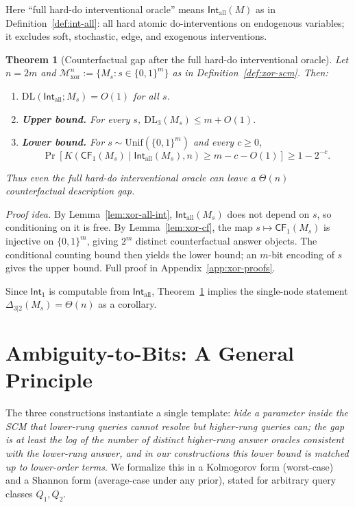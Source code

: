 \documentclass{article}
\theoremstyle{plain}
\newtheorem{theorem}{Theorem}[section]
\theoremstyle{definition}
\newcommand{\calM}{\mathcal{M}}
\newcommand{\Int}{\mathsf{Int}}
\newcommand{\CF}{\mathsf{CF}}
\newcommand{\DL}{\mathrm{DL}}
\begin{document}
Here ``full hard-do interventional oracle'' means $\Int_{\mathrm{all}}(M)$ as in Definition~\ref{def:int-all}: all hard atomic do-interventions on endogenous variables; it excludes soft, stochastic, edge, and exogenous interventions.

\begin{theorem}[Counterfactual gap after the full hard-do interventional oracle]
\label{thm:cf-separation}
Let $n = 2m$ and $\calM_{\mathrm{xor}}^n := \{M_s : s \in \{0,1\}^m\}$ as in Definition~\ref{def:xor-scm}. Then:
\begin{enumerate}
    \item $\DL(\Int_{\mathrm{all}}; M_s) = O(1)$ for all $s$.
    \item \textbf{Upper bound.} For every $s$, $\DL_3(M_s) \leq m + O(1)$.
    \item \textbf{Lower bound.} For $s \sim \mathrm{Unif}(\{0,1\}^m)$ and every $c \geq 0$,
    \[
        \Pr\!\left[ K\!\left(\CF_1(M_s) \mid \Int_{\mathrm{all}}(M_s), n\right) \geq m - c - O(1) \right] \geq 1 - 2^{-c}.
    \]
\end{enumerate}
Thus even the full hard-do interventional oracle can leave a $\Theta(n)$ counterfactual description gap.
\end{theorem}

\emph{Proof idea.} By Lemma~\ref{lem:xor-all-int}, $\Int_{\mathrm{all}}(M_s)$ does not depend on $s$, so conditioning on it is free. By Lemma~\ref{lem:xor-cf}, the map $s \mapsto \CF_1(M_s)$ is injective on $\{0,1\}^m$, giving $2^m$ distinct counterfactual answer objects. The conditional counting bound then yields the lower bound; an $m$-bit encoding of $s$ gives the upper bound. Full proof in Appendix~\ref{app:xor-proofs}.


Since $\Int_1$ is computable from $\Int_{\mathrm{all}}$, Theorem~\ref{thm:cf-separation} implies the single-node statement $\Delta_{3|2}(M_s) = \Theta(n)$ as a corollary.

\section{Ambiguity-to-Bits: A General Principle}
\label{sec:general}

The three constructions instantiate a single template: \emph{hide a parameter inside the SCM that lower-rung queries cannot resolve but higher-rung queries can; the gap is at least the log of the number of distinct higher-rung answer oracles consistent with the lower-rung answer, and in our constructions this lower bound is matched up to lower-order terms}. We formalize this in a Kolmogorov form (worst-case) and a Shannon form (average-case under any prior), stated for arbitrary query classes $Q_1, Q_2$.
\end{document}
